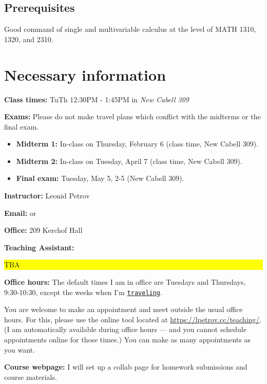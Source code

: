 \documentclass[oneside,11pt]{amsart}
\begin{document}
\subsection*{Prerequisites}

Good command of single and multivariable calculus at the level of MATH 1310, 1320, and 2310.

\section{Necessary information}
\bigskip

\textbf{Class times:}   TuTh 12:30PM - 1:45PM in
\emph{New Cabell 309}

\medskip


\textbf{Exams:} Please do not make travel plans which conflict
with the midterms or the final exam.
\begin{itemize}
	\item \textbf{Midterm 1:} In-class on Thursday, February 6 (class time, New Cabell 309).
	\item \textbf{Midterm 2:} In-class on Tuesday, April 7 (class time, New Cabell 309).
	\item \textbf{Final exam:} Tuesday, May 5, 2-5 (New Cabell 309).
\end{itemize}

\medskip

\textbf{Instructor:} Leonid Petrov
\medskip

\textbf{Email:}  or 
\medskip

\textbf{Office:} 209 Kerchof Hall
\medskip

\textbf{Teaching Assistant:} \colorbox{yellow}{\parbox{.7\textwidth}{TBA}}
\medskip

\textbf{Office hours:}
The default times I am in office are Tuesdays and Thursdays, 9:30-10:30,
except the weeks when I'm \href{https://lpetrov.cc/2019/05/travel-2020/}{\texttt{traveling}}.

You are welcome to make an appointment and meet outside the usual office hours. 
For this, please use the online tool located at
\url{https://lpetrov.cc/teaching/}. (I am automatically available during office hours --- 
and you cannot schedule appointments online for those times.)
You can make as 
many appointments as you want.

\medskip

\textbf{Course webpage:}
I will set up a collab page for homework submissions and course materials.
\end{document}
